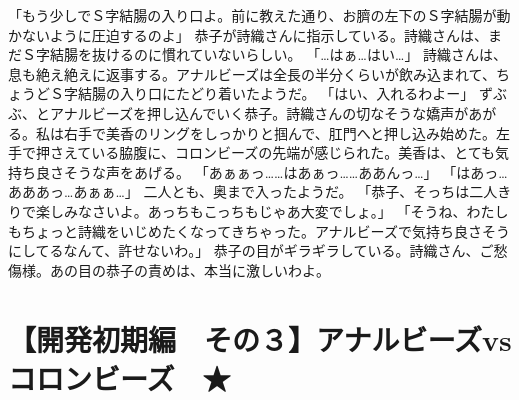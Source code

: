「もう少しでＳ字結腸の入り口よ。前に教えた通り、お臍の左下のＳ字結腸が動かないように圧迫するのよ」
恭子が詩織さんに指示している。詩織さんは、まだＳ字結腸を抜けるのに慣れていないらしい。
「…はぁ…はい…」
詩織さんは、息も絶え絶えに返事する。アナルビーズは全長の半分くらいが飲み込まれて、ちょうどＳ字結腸の入り口にたどり着いたようだ。
「はい、入れるわよー」
ずぶぶ、とアナルビーズを押し込んでいく恭子。詩織さんの切なそうな嬌声があがる。私は右手で美香のリングをしっかりと掴んで、肛門へと押し込み始めた。左手で押さえている脇腹に、コロンビーズの先端が感じられた。美香は、とても気持ち良さそうな声をあげる。
「あぁぁっ……はあぁっ……ああんっ…」
「はあっ…あああっ…あぁぁ…」
二人とも、奥まで入ったようだ。
「恭子、そっちは二人きりで楽しみなさいよ。あっちもこっちもじゃあ大変でしょ。」
「そうね、わたしもちょっと詩織をいじめたくなってきちゃった。アナルビーズで気持ち良さそうにしてるなんて、許せないわ。」
恭子の目がギラギラしている。詩織さん、ご愁傷様。あの目の恭子の責めは、本当に激しいわよ。


\section{【開発初期編　その３】アナルビーズvsコロンビーズ　★}

